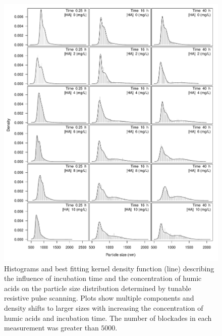 \documentclass[journal=langd5,manuscript=article]{achemso}
\begin{document}
 \begin{figure}
  \includegraphics[width=\linewidth]{Figures/MCluster_MS_HA_density.pdf}
  \caption{Histograms and best fitting kernel density function (line) describing the influence of incubation time and the concentration of humic acids on the particle size distribution determined by tunable resistive pulse scanning. Plots show multiple components and density shifts to larger sizes with increasing the concentration of humic acids and incubation time. The number of blockades in each measurement was greater than $5000$.} 
  \label{fgr:multiplot_density}
\end{figure}
\end{document}
